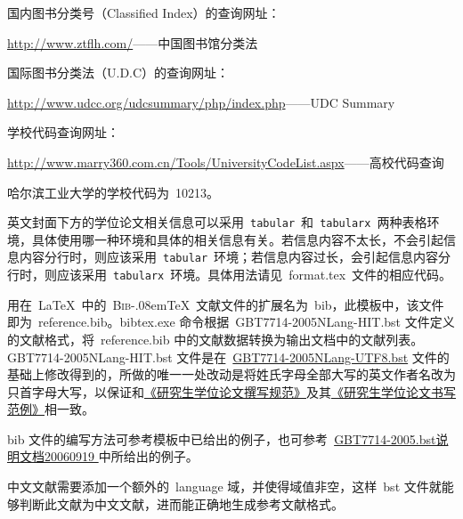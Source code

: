 

国内图书分类号（Classif\/ied Index）的查询网址：

\centerline{\href{http://www.ztflh.com/}{http://www.ztflh.com/}——中国图书馆分类法}
国际图书分类法（U.D.C）的查询网址：

\centerline{\href{http://www.udcc.org/udcsummary/php/index.php}{http://www.udcc.org/udcsummary/php/index.php}——UDC Summary}
学校代码查询网址：

\centerline{\href{http://www.marry360.com.cn/Tools/UniversityCodeList.aspx}{http://www.marry360.com.cn/Tools/UniversityCodeList.aspx}——高校代码查询}
\noindent 哈尔滨工业大学的学校代码为~10213。

英文封面下方的学位论文相关信息可以采用~\verb|tabular|~和~\verb|tabularx|~两种表格环境，具体使用哪一种环境和具体的相关信息有关。若信息内容不太长，不会引起信息内容分行时，则应该采用~\verb|tabular|~环境；若信息内容过长，会引起信息内容分行时，则应该采用~\verb|tabularx|~环境。具体用法请见~format.tex~文件的相应代码。

用在~\LaTeX~中的~\textsc{Bib}\kern-.08em\TeX~文献文件的扩展名为~bib，此模板中，该文件即为~reference.bib。bibtex.exe 命令根据~GBT7714-2005NLang-HIT.bst 文件定义的文献格式，将~reference.bib 中的文献数据转换为输出文档中的文献列表。GBT7714-2005NLang-HIT.bst 文件是在~\href{http://bbs.ctex.org/attachment.php?aid=MjA3MDh8ZDcyMjc2MTN8MTMyNTYzNjY4OHxhZTg4bkNCUVJiRzA0WmU3TmlMbVdTUVExa0xtV2puWWc0dkdqbVJhbTVMdy9mVQ\%3D\%3D}{GBT7714-2005NLang-UTF8.bst} 文件的基础上修改得到的，所做的唯一一处改动是将姓氏字母全部大写的英文作者名改为只首字母大写，以保证和\href{http://219.217.226.141/xuewei/guifan.doc}{《研究生学位论文撰写规范》}及其\href{http://219.217.226.141/xuewei/fanli.doc}{《研究生学位论文书写范例》}相一致。

bib 文件的编写方法可参考模板中已给出的例子，也可参考~\href{http://bbs.ctex.org/attachment.php?aid=MTk3OTd8NjY1ODc5OGV8MTMyNTY0MTEyMnxhZGZkYWpsa0I2RGZwNDR5Z1lyeStjb1dKRS8rTnJub3lvT2FkNDNJbHl1UWVkVQ\%3D\%3D}{GBT7714-2005.bst说明文档20060919
} 中所给出的例子。

中文文献需要添加一个额外的~language 域，并使得域值非空，这样~bst 文件就能够判断此文献为中文文献，进而能正确地生成参考文献格式。

